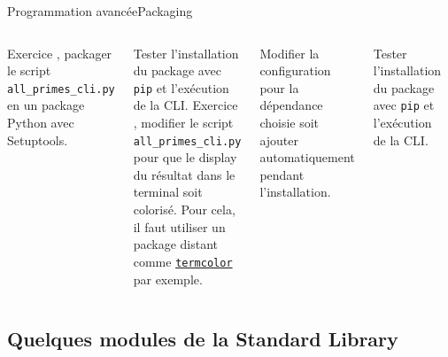 \documentclass{beamer}
\begin{document}
    \begin{frame}{Programmation avancée}{Packaging}
        \begin{columns}
            Exercice \execcounterdispinc{}, packager le script \lstinline{all_primes_cli.py} en un package Python avec Setuptools.

            Tester l'installation du package avec \lstinline{pip} et l'exécution de la CLI.
            \bigbreak
            Exercice \execcounterdispinc{}, modifier le script \lstinline{all_primes_cli.py} pour que le display du résultat dans le terminal soit colorisé.
            Pour cela, il faut utiliser un package distant comme \href{https://pypi.org/project/termcolor/}{\lstinline{termcolor}} par exemple.

            Modifier la configuration pour la dépendance choisie soit ajouter automatiquement pendant l'installation.

            Tester l'installation du package avec \lstinline{pip} et l'exécution de la CLI.
            \begin{center}
                \includegraphics[width=4cm]{image/python-luggage}
            \end{center}
        \end{columns}
    \end{frame}

    \subsection{Quelques modules de la Standard Library}\label{subsec:std-modules}
\end{document}

